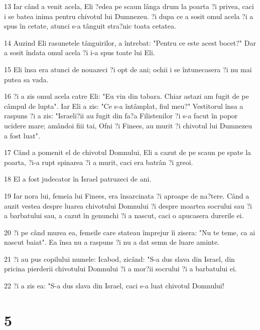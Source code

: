 \par 13 Iar când a venit acela, Eli ?edea pe scaun lânga drum la poarta ?i privea, caci i se batea inima pentru chivotul lui Dumnezeu. ?i dupa ce a sosit omul acela ?i a spus în cetate, atunci s-a tânguit stra?nic toata cetatea.
\par 14 Auzind Eli rasunetele tânguirilor, a întrebat: "Pentru ce este acest bocet?" Dar a sosit îndata omul acela ?i i-a spus toate lui Eli.
\par 15 Eli însa era atunci de nouazeci ?i opt de ani; ochii i se întunecasera ?i nu mai putea sa vada.
\par 16 ?i a zis omul acela catre Eli: "Eu vin din tabara. Chiar astazi am fugit de pe câmpul de lupta". Iar Eli a zis: "Ce s-a întâmplat, fiul meu?" Vestitorul însa a raspuns ?i a zis: "Israeli?ii au fugit din fa?a Filistenilor ?i s-a facut în popor ucidere mare; amândoi fiii tai, Ofni ?i Finees, au murit ?i chivotul lui Dumnezeu a fost luat".
\par 17 Când a pomenit el de chivotul Domnului, Eli a cazut de pe scaun pe spate la poarta, ?i-a rupt spinarea ?i a murit, caci era batrân ?i greoi.
\par 18 El a fost judecator în Israel patruzeci de ani.
\par 19 Iar nora lui, femeia lui Finees, era însarcinata ?i aproape de na?tere. Când a auzit vestea despre luarea chivotului Domnului ?i despre moartea socrului sau ?i a barbatului sau, a cazut în genunchi ?i a nascut, caci o apucasera durerile ei.
\par 20 ?i pe când murea ea, femeile care stateau împrejur îi zisera: "Nu te teme, ca ai nascut baiat". Ea însa nu a raspuns ?i nu a dat semn de luare aminte.
\par 21 ?i au pus copilului numele: Icabod, zicând: "S-a dus slava din Israel, din pricina pierderii chivotului Domnului ?i a mor?ii socrului ?i a barbatului ei.
\par 22 ?i a zis ea: "S-a dus slava din Israel, caci s-a luat chivotul Domnului!

\chapter{5}

